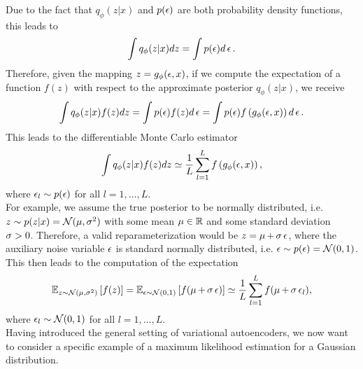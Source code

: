 Due to the fact that $q_{\phi} (z|x)$ and $p(\operatorname{\epsilon})$ are both probability density functions, this leads to
\begin{align*}
\int q_{\phi} (z|x) dz = \int p(\operatorname{\epsilon}) d\operatorname{\epsilon}.
\end{align*}
Therefore, given the mapping $z = g_{\phi}(\operatorname{\epsilon}, x)$, if we compute the expectation of a function $f(z)$ with respect to the approximate posterior $q_{\phi}(z|x)$, we receive
\begin{align*}
\int q_{\phi}(z|x) f(z) dz = \int p(\operatorname{\epsilon}) f(z) d\operatorname{\epsilon} = \int p(\operatorname{\epsilon}) f\left(g_{\phi}(\operatorname{\epsilon}, x) \right)d\operatorname{\epsilon}.
\end{align*}
This leads to the differentiable Monte Carlo estimator
\begin{align*}
\int q_{\phi}(z|x) f(z) dz \simeq \frac{1}{L} \sum_{l=1}^L f\left(g_{\phi} (\operatorname{\epsilon}, x)\right),
\end{align*}
where $\operatorname{\epsilon}_l\sim p(\operatorname{\epsilon})$ for all $l=1,\ldots, L$.\\
For example, we assume the true posterior to be normally distributed, i.e. $z\sim p(z|x)=\mathcal{N}(\operatorname{\mu}, \operatorname{\sigma}^2)$ with some mean $\operatorname{\mu}\in\operatorname{\mathbb{R}}$ and some standard deviation $\operatorname{\sigma}>0$. Therefore, a valid reparameterization would be $z = \operatorname{\mu} +\operatorname{\sigma}\operatorname{\epsilon}$, where the auxiliary noise variable $\operatorname{\epsilon}$ is standard normally distributed, i.e. $\operatorname{\epsilon}\sim p(\operatorname{\epsilon}) = \mathcal{N}(0,1)$. This then leads to the computation of the expectation
\begin{align*}
\operatorname{\mathbb{E}}_{z\sim \mathcal{N}(\operatorname{\mu}, \operatorname{\sigma}^2)} \left[ f(z) \right] = \operatorname{\mathbb{E}}_{\operatorname{\epsilon} \sim \mathcal{N}(0, 1)} \left[ f(\operatorname{\mu} + \operatorname{\sigma}\operatorname{\epsilon}) \right] \simeq \frac{1}{L} \sum_{l=1}^L f(\operatorname{\mu} + \operatorname{\sigma}\operatorname{\epsilon}_l),
\end{align*}
where $\operatorname{\epsilon}_l\sim \mathcal{N}(0, 1)$ for all $l=1,\ldots, L$.\\
Having introduced the general setting of variational autoencoders, we now want to consider a specific example of a maximum likelihood estimation for a Gaussian distribution.
